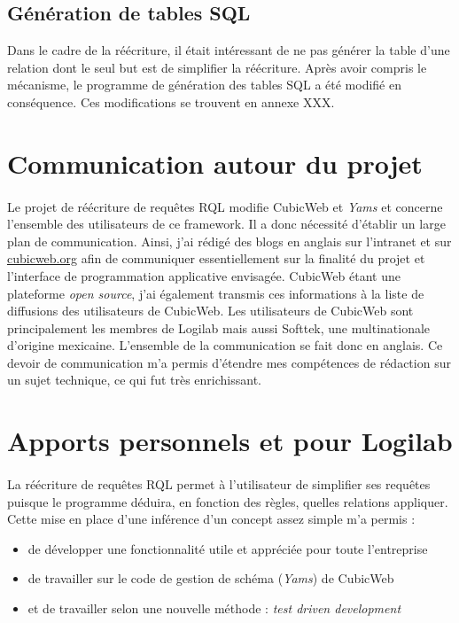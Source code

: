 \documentclass {report}
\begin{document}
\subsection{Génération de tables SQL}
Dans le cadre de la réécriture, il était intéressant de ne pas générer la table d'une relation dont le seul but est de simplifier la réécriture. Après avoir compris le mécanisme, le programme de génération des tables SQL a été modifié en conséquence. Ces modifications se trouvent en annexe XXX.


\section{Communication autour du projet}
\paragraph{}
Le projet de réécriture de requêtes RQL modifie CubicWeb et \textit{Yams} et concerne l'ensemble des utilisateurs de ce framework. Il a donc nécessité d'établir un large plan de communication. Ainsi, j'ai rédigé des blogs en anglais sur l'intranet et sur \url{cubicweb.org} afin de communiquer essentiellement sur la finalité du projet et l'interface de programmation applicative envisagée. CubicWeb étant une plateforme \textit{open source}, j'ai également transmis ces informations à la liste de diffusions des utilisateurs de CubicWeb. Les utilisateurs de CubicWeb sont principalement les membres de Logilab mais aussi Softtek, une multinationale d'origine mexicaine. L'ensemble de la communication se fait donc en anglais. Ce devoir de communication m'a permis d'étendre mes compétences de rédaction sur un sujet technique, ce qui fut très enrichissant.




\section{Apports personnels et pour Logilab}
\paragraph{}
La réécriture de requêtes RQL permet à l'utilisateur de simplifier ses requêtes puisque le programme déduira, en fonction des règles, quelles relations appliquer. Cette mise en place d'une inférence d'un concept assez simple m'a permis : 
    \begin{itemize}
    \item de développer une fonctionnalité utile et appréciée pour toute l'entreprise
    \item de travailler sur le code de gestion de schéma (\textit{Yams}) de CubicWeb
    \item et de travailler selon une nouvelle méthode : \textit{test driven development}
    \end{itemize}
\end{document}
